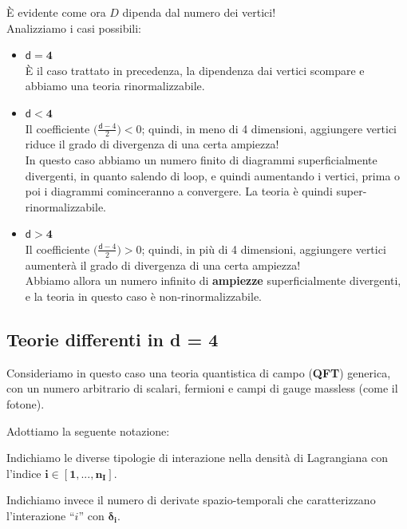 \documentclass[../main.tex]{subfiles}
\begin{document}
È evidente come ora $D$ dipenda dal numero dei vertici!\\

Analizziamo i casi possibili:
\begin{itemize}
    \item $\mathbf{\mathsf{d} = 4}$\\
          È il caso trattato in precedenza, la dipendenza dai vertici scompare e abbiamo una teoria rinormalizzabile.
    \item $\mathbf{\mathsf{d} < 4}$\\
          Il coefficiente $\bigl(\frac{\mathsf{d}-4}{2}\bigr) < 0$; quindi, in meno di 4 dimensioni, aggiungere vertici riduce il grado di divergenza di una certa ampiezza!\\
          In questo caso abbiamo un numero finito di diagrammi superficialmente divergenti, in quanto salendo di loop, e quindi aumentando i vertici, prima o poi i diagrammi cominceranno a convergere. La teoria è quindi super-rinormalizzabile.
    \item $\mathbf{\mathsf{d} > 4}$\\
          Il coefficiente $\bigl(\frac{\mathsf{d}-4}{2}\bigr) > 0$; quindi, in più di 4 dimensioni, aggiungere vertici aumenterà il grado di divergenza di una certa ampiezza!\\
          Abbiamo allora un numero infinito di \textbf{ampiezze} superficialmente divergenti, e la teoria in questo caso è non-rinormalizzabile.
          
\end{itemize}

\subsection{Teorie differenti in \textsf d = 4}

Consideriamo in questo caso una teoria quantistica di campo (\textbf{QFT}) generica, con un numero arbitrario di scalari, fermioni e campi di gauge massless (come il fotone).

Adottiamo la seguente notazione:
\begin{kaobox}
Indichiamo le diverse tipologie di interazione nella densità di Lagrangiana con l'indice $\mathbf{i\in[1,...,n_I]}$.
\end{kaobox}

\begin{kaobox}
Indichiamo invece il numero di derivate spazio-temporali che caratterizzano l'interazione “$i$” con $\mathbf{\delta_i}$. 
\end{kaobox}
\end{document}
